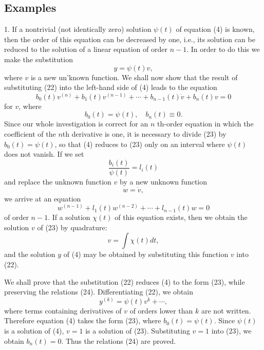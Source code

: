 \documentclass[10pt,a5paper]{book}
\theoremstyle{plain}
\theoremstyle{definition}
\theoremstyle{remark}
\begin{document}
\subsection*{Examples}
1. If a nontrivial (not identically zero) solution $\psi(t)$ of equation (4) is known, then the order of this equation can be decreased by one, i.e., its solution can be reduced to the solution of a linear equation of order $n-1$. In order to do this we make the substitution
\begin{equation*}
y=\psi(t) v, \tag{22}
\end{equation*}
where $v$ is a new un'known function. We shall now show that the result of substituting (22) into the left-hand side of (4) leads to the equation
\begin{equation*}
b_{0}(t) v^{(n)}+b_{1}(t) v^{(n-1)}+\cdots+b_{n-1}(t) \dot{v}+b_{n}(t) v=0 \tag{23}
\end{equation*}
for $v$, where
\begin{equation*}
b_{0}(t)=\psi(t), \quad b_{n}(t) \equiv 0 . \tag{24}
\end{equation*}
Since our whole investigation is correct for an $n$ th-order equation in which the coefficient of the $n$th derivative is one, it is necessary to divide (23) by $b_{0}(t)=\psi(t)$, so that (4) reduces to (23) only on an interval where $\psi(t)$ does not vanish. If we set
\[
\frac{b_{i}(t)}{\psi(t)}=l_{i}(t)
\]
and replace the unknown function $v$ by a new unknown function
\[
w=\dot{v},
\]
we arrive at an equation
\[
w^{(n-1)}+l_{1}(t) w^{(n-2)}+\cdots+l_{n-1}(t) w=0
\]
of order $n-1$. If a solution $\chi(t)$ of this equation exists, then we obtain the solution $v$ of (23) by quadrature:
\[
v=\int \chi(t) d t,
\]
and the solution $y$ of (4) may be obtained by substituting this function $v$ into (22).

We shall prove that the substitution (22) reduces (4) to the form (23), while preserving the relations (24). Differentiating (22), we obtain
\[
y^{(k)}=\psi(t) v^{k}+\cdots,
\]
where terms containing derivatives of $v$ of orders lower than $k$ are not written. Therefore equation (4) takes the form (23), where $b_{0}(t)=\psi(t)$. Since $\psi(t)$ is a solution of (4), $v=1$ is a solution of (23). Substituting $v=1$ into (23), we obtain $b_{n}(t)=0$. Thus the relations (24) are proved.
\end{document}
